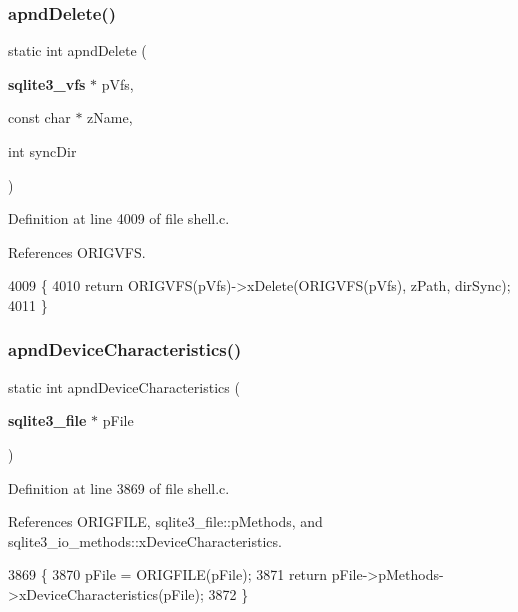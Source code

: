 \subsubsection{apnd\+Delete()}
{\footnotesize\ttfamily static int apnd\+Delete (\begin{DoxyParamCaption}\item[{\textbf{ sqlite3\+\_\+vfs} $\ast$}]{p\+Vfs,  }\item[{const char $\ast$}]{z\+Name,  }\item[{int}]{sync\+Dir }\end{DoxyParamCaption})\hspace{0.3cm}{\ttfamily [static]}}



Definition at line 4009 of file shell.\+c.



References O\+R\+I\+G\+V\+FS.


\begin{DoxyCode}
4009                                                                         \{
4010   \textcolor{keywordflow}{return} ORIGVFS(pVfs)->xDelete(ORIGVFS(pVfs), zPath, dirSync);
4011 \}
\end{DoxyCode}
\mbox{\label{shell_8c_a24460dd1b75637b1717d45c3e2ad9af7}} 
\subsubsection{apnd\+Device\+Characteristics()}
{\footnotesize\ttfamily static int apnd\+Device\+Characteristics (\begin{DoxyParamCaption}\item[{\textbf{ sqlite3\+\_\+file} $\ast$}]{p\+File }\end{DoxyParamCaption})\hspace{0.3cm}{\ttfamily [static]}}



Definition at line 3869 of file shell.\+c.



References O\+R\+I\+G\+F\+I\+LE, sqlite3\+\_\+file\+::p\+Methods, and sqlite3\+\_\+io\+\_\+methods\+::x\+Device\+Characteristics.


\begin{DoxyCode}
3869                                                          \{
3870   pFile = ORIGFILE(pFile);
3871   \textcolor{keywordflow}{return} pFile->pMethods->xDeviceCharacteristics(pFile);
3872 \}
\end{DoxyCode}
\mbox{\label{shell_8c_ad67889d5a50a8af32f1ffd3363ca0e29}} 

